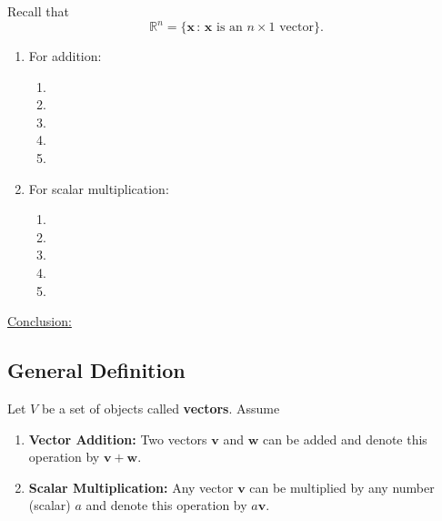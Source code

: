 \documentclass[20pt,a4paper]{extarticle}
\begin{document}
Recall that 
	$$
		\mathbb{R}^n = \{ \mathbf{x} \, : \, \mathbf{x} \text{ is an } n \times 1 \text{ vector} \} .
	$$
	\begin{enumerate}[label=\Circled{\arabic*}]
		\item For addition:
			\begin{enumerate}[label=\fbox{A\arabic*.}]
				\item %
				\item %
				\item %
				\item %
				\item {}
				\vspace*{0.1cm}
			\end{enumerate}
		\item For scalar multiplication:
			\begin{enumerate}[label=\fbox{S\arabic*.}]
				\item %
				\item %
				\item %
				\item %
				\item %
			\end{enumerate}
	\end{enumerate}

\underline{Conclusion:} %

\newpage 

\subsection{General Definition}

Let $V$ be a set of objects called \textbf{vectors}. Assume
	\begin{enumerate}
		\item \textbf{Vector Addition:} Two vectors $\mathbf{v}$ and $\mathbf{w}$ can be added and denote this operation by $\mathbf{v} + \mathbf{w}$.
		\item \textbf{Scalar Multiplication:} Any vector $\mathbf{v}$ can be multiplied by any number (scalar) $a$ and denote this operation by $a \mathbf{v}$.
	\end{enumerate}
\end{document}
